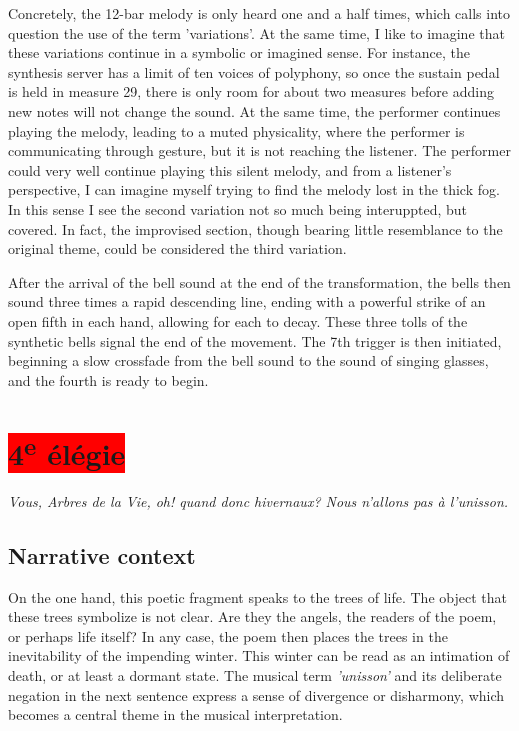 \documentclass[12pt,twoside,maitrise]{dms_ks}
\theoremstyle{definition}
\begin{document}
{Concretely, the 12-bar melody is only heard one and a half times, which calls into question the use of the term 'variations'. 
At the same time, I like to imagine that these variations continue in a symbolic or imagined sense. 
For instance, the synthesis server has a limit of ten voices of polyphony, so once the sustain pedal is held in measure 29, there is only room for about two measures before adding new notes will not change the sound. 
At the same time, the performer continues playing the melody, leading to a muted physicality, where the performer is communicating through gesture, but it is not reaching the listener. 
The performer could very well continue playing this silent melody, and from a listener's perspective, I can imagine myself trying to find the melody lost in the thick fog. 
In this sense I see the second variation not so much being interuppted, but covered. 
In fact, the improvised section, though bearing little resemblance to the original theme, could be considered the third variation.

After the arrival of the bell sound at the end of the transformation, the bells then sound three times a rapid descending line, ending with a powerful strike of an open fifth in each hand, allowing for each to decay. 
These three tolls of the synthetic bells signal the end of the movement. 
The 7th trigger is then initiated, beginning a slow crossfade from the bell sound to the sound of singing glasses, and the fourth is ready to begin.


\section{\colorbox{red}{4\textsuperscript{e} élégie}}

\epigraph{\textit{Vous, Arbres de la Vie, oh! quand donc hivernaux? Nous n'allons pas à l'unisson.}}{}

\subsection{Narrative context}

On the one hand, this poetic fragment speaks to the trees of life.
The object that these trees symbolize is not clear.
Are they the angels, the readers of the poem, or perhaps life itself?
In any case, the poem then places the trees in the inevitability of the impending winter.
This winter can be read as an intimation of death, or at least a dormant state.
The musical term \textit{'unisson'} and its deliberate negation in the next sentence express a sense of divergence or disharmony, which becomes a central theme in the musical interpretation.

}
\end{document}
